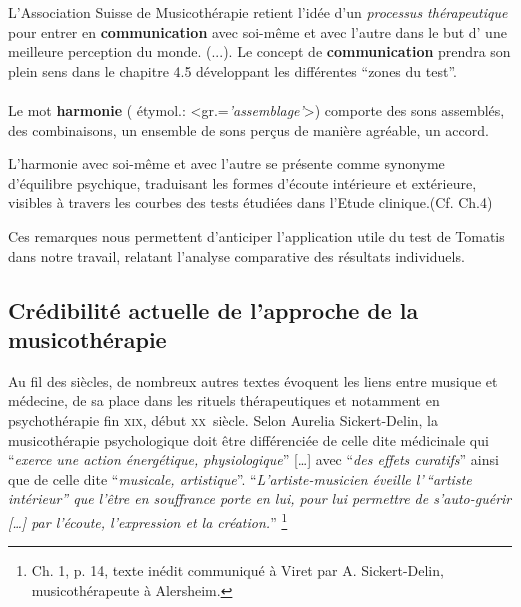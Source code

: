 L'Association Suisse
de Musicothérapie retient l'idée d'un\textit{ processus thérapeutique }pour entrer en \textbf{communication} avec soi-même et avec 
l'autre dans le but d' une meilleure perception du
monde. (...)\autocite{site_musitherapy}.
Le concept de \textbf{communication} prendra son plein sens 
dans le chapitre 4.5 développant les différentes ``zones du test''.
\paragraph{}
Le mot \textbf{harmonie} ( étymol.:
<gr.=\textit{'assemblage'}>) comporte 
 des sons assemblés, des combinaisons, un ensemble de sons perçus de
 manière agréable, un accord.
 
 L'harmonie avec soi-même et avec l'autre se présente comme  synonyme d'équilibre
psychique, traduisant les formes d'écoute intérieure et
extérieure,  visibles à travers les courbes des tests étudiées
dans l'Etude clinique.(Cf. Ch.4)



Ces remarques nous permettent d'anticiper
l'application utile du test de Tomatis dans notre travail, relatant l'analyse
comparative des résultats individuels.

 
\subsection{Crédibilité actuelle de l'approche de la musicothérapie }


Au fil des siècles, de nombreux autres 
textes évoquent les liens entre musique et médecine, de sa place dans les 
rituels thérapeutiques et notamment en psychothérapie fin \textsc{xix}\ieme, 
début \textsc{xx}\ieme\ siècle.
Selon Aurelia Sickert-Delin, la musicothérapie 
psychologique doit être différenciée de celle dite médicinale qui 
\enquote{\emph{exerce une action 
énergétique, physiologique}} [\dots] avec \enquote{\emph{des effets curatifs}}  
ainsi que de celle dite \enquote{\emph{musicale, artistique}}. 
\enquote{\emph{L'artiste-musicien éveille l'\,``artiste intérieur'' que l'être 
en souffrance porte en lui, pour lui permettre de s'auto-guérir [\dots] par 
l'écoute, l'expression et la création.}}
\autocite {viret:b} \footnote{ Ch. 1,  p. 14, texte 
inédit communiqué à Viret par A. Sickert-Delin, musicothérapeute à Alersheim.}

